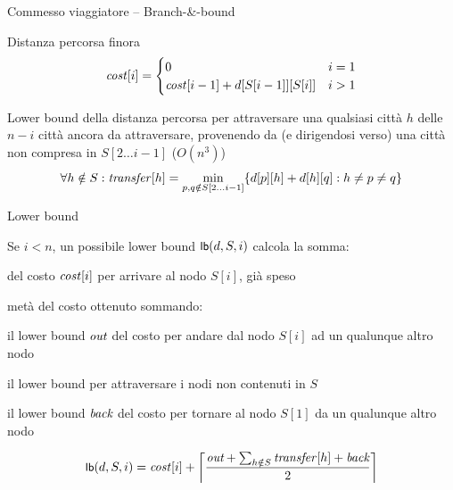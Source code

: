\begin{frame}{Commesso viaggiatore -- Branch-\&-bound}

\BIL
\item Distanza percorsa finora
\medskip
\alert{\[
\mathit{cost}[i] = \begin{cases}
  0 & i=1 \\
  \mathit{cost}[i-1] + d[S[i-1]][S[i]] & i>1
\end{cases}
\]
}\EIL
{}
\BIL
\item Lower bound della distanza percorsa per attraversare una qualsiasi città $h$ delle $n-i$ città ancora da attraversare, provenendo da (e dirigendosi verso) una città non compresa in $S[2 \ldots i-1]$ ($O(n^3)$)
\medskip
\alert{\[
\forall h \notin S: \mathit{transfer}[h] = \min_{p,q \notin S[2 \ldots i-1]}\{d[p][h] + d[h][q] : h \neq p \neq q \}
\]
}\EIL

\end{frame}

\begin{frame}{Lower bound}

\vspace{-9pt}
Se $i<n$, un possibile lower bound $\textsf{{\small lb}}(d, S, i)$ calcola la somma:
\BIL
\item del costo $\mathit{cost}[i]$ per arrivare al nodo $S[i]$, già speso
\item metà del costo ottenuto sommando:
\BI
\item il lower bound $\textit{out}$ del costo per andare dal nodo $S[i]$ ad un qualunque altro nodo
\item il lower bound per attraversare i nodi non contenuti in $S$
\item il lower bound $\textit{back}$ del costo per tornare al nodo $S[1]$ da un qualunque altro nodo
\EI
\EIL

\[
\textsf{{\small lb}}(d, S, i) = \mathit{cost}[i] + \left\lceil \frac{\textit{out} + \sum_{h \notin S} \mathit{transfer}[h] + \textit{back}}{2} \right\rceil 
\]
\end{frame}

